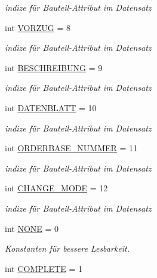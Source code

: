 \begin{DoxyCompactItemize}
\begin{DoxyCompactList}\small\item\em indize für Bauteil-\/\+Attribut im Datensatz \end{DoxyCompactList}\item 
int \hyperlink{_platzhalter_ersetzen_8ulp_ab66e65ec79f498320544459cd478986a}{V\+O\+R\+Z\+U\+G} = 8
\begin{DoxyCompactList}\small\item\em indize für Bauteil-\/\+Attribut im Datensatz \end{DoxyCompactList}\item 
int \hyperlink{_platzhalter_ersetzen_8ulp_ae410fcb7dc0f5e163526a9c617a825de}{B\+E\+S\+C\+H\+R\+E\+I\+B\+U\+N\+G} = 9
\begin{DoxyCompactList}\small\item\em indize für Bauteil-\/\+Attribut im Datensatz \end{DoxyCompactList}\item 
int \hyperlink{_platzhalter_ersetzen_8ulp_aaeb2c4795b541d0c2dd2b787afb421f2}{D\+A\+T\+E\+N\+B\+L\+A\+T\+T} = 10
\begin{DoxyCompactList}\small\item\em indize für Bauteil-\/\+Attribut im Datensatz \end{DoxyCompactList}\item 
int \hyperlink{_platzhalter_ersetzen_8ulp_a7cdee93856dbfbbf6b1351c9525f6cb0}{O\+R\+D\+E\+R\+B\+A\+S\+E\+\_\+\+N\+U\+M\+M\+E\+R} = 11
\begin{DoxyCompactList}\small\item\em indize für Bauteil-\/\+Attribut im Datensatz \end{DoxyCompactList}\item 
int \hyperlink{_platzhalter_ersetzen_8ulp_a3389481e9b966a29fb48e172a5942ddd}{C\+H\+A\+N\+G\+E\+\_\+\+M\+O\+D\+E} = 12
\begin{DoxyCompactList}\small\item\em indize für Bauteil-\/\+Attribut im Datensatz \end{DoxyCompactList}\item 
int \hyperlink{_platzhalter_ersetzen_8ulp_a8da3a66cae7ac2c40966de471684f3fb}{N\+O\+N\+E} = 0
\begin{DoxyCompactList}\small\item\em Konstanten für bessere Lesbarkeit. \end{DoxyCompactList}\item 
int \hyperlink{_platzhalter_ersetzen_8ulp_a01030b244f6352425e8de676f9d43288}{C\+O\+M\+P\+L\+E\+T\+E} = 1

\end{DoxyCompactItemize}
